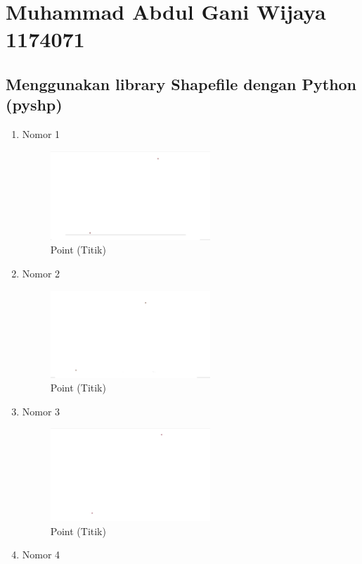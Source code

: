 \section{Muhammad Abdul Gani Wijaya 1174071}
\subsection{Menggunakan library Shapefile dengan Python (pyshp)}
\begin{enumerate}
	\item Nomor 1
	
	\begin{figure}[H]
		\includegraphics[width=6cm]{figures/Tugas2/1174071/soal1.png}
		\centering
		\caption{Point (Titik)}
	\end{figure}
	\item Nomor 2
	
	\begin{figure}[H]
		\includegraphics[width=6cm]{figures/Tugas2/1174071/soal2.png}
		\centering
		\caption{Point (Titik)}
	\end{figure}
	\item Nomor 3
	
	\begin{figure}[H]
		\includegraphics[width=6cm]{figures/Tugas2/1174071/soal3.png}
		\centering
		\caption{Point (Titik)}
	\end{figure}
	\item Nomor 4

\end{enumerate}
